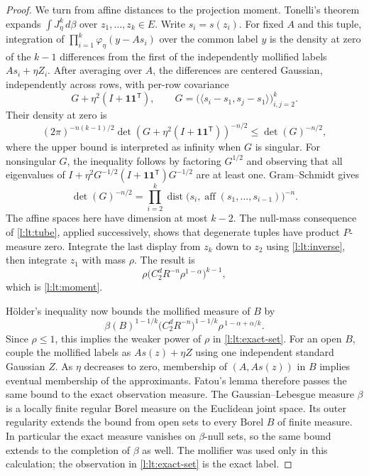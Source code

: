 \begin{proof}
We turn from affine distances to the projection moment.  Tonelli's
theorem expands $\int J_\eta^k\,d\beta$ over
$z_1,\ldots,z_k\in E$.  Write $s_i=s(z_i)$.  For fixed $A$ and this
tuple, integration of
$\prod_{i=1}^k\varphi_\eta(y-As_i)$ over the common label $y$ is the
density at zero of the $k-1$ differences from the first of the
independently mollified labels $As_i+\eta Z_i$.  After averaging over
$A$, the differences are centered Gaussian, independently across
rows, with per-row covariance
\begin{equation}\label{l:lt:covariance}
 G+\eta^2(I+\mathbf1\mathbf1^{\mathsf T}),\qquad
 G=\bigl(\langle s_i-s_1,s_j-s_1\rangle\bigr)_{i,j=2}^k.
\end{equation}
Their density at zero is
\[
 (2\pi)^{-n(k-1)/2}
 \det\!\left(G+\eta^2(I+\mathbf1\mathbf1^{\mathsf T})\right)^{-n/2}
 \le \det(G)^{-n/2},
\]
where the upper bound is interpreted as infinity when $G$ is
singular.  For nonsingular $G$, the inequality follows by factoring
$G^{1/2}$ and observing that all eigenvalues of
$I+\eta^2G^{-1/2}(I+\mathbf1\mathbf1^{\mathsf T})G^{-1/2}$
are at least one.  Gram--Schmidt gives
\[
 \det(G)^{-n/2}
 =\prod_{i=2}^k
   \operatorname{dist}\bigl(s_i,
      \operatorname{aff}(s_1,\ldots,s_{i-1})\bigr)^{-n}.
\]
The affine spaces here have dimension at most $k-2$.  The null-mass
consequence of \eqref{l:lt:tube}, applied successively, shows that
degenerate tuples have product $P$-measure zero.  Integrate the last
display from $z_k$ down to $z_2$ using \eqref{l:lt:inverse}, then
integrate $z_1$ with mass $\rho$.  The result is
\[
 \rho\bigl(C_2^dR^{-n}\rho^{1-\alpha}\bigr)^{k-1},
\]
which is \eqref{l:lt:moment}.

H\"older's inequality now bounds the mollified measure of $B$ by
\[
 \beta(B)^{1-1/k}
 \bigl(C_2^dR^{-n}\bigr)^{1-1/k}
 \rho^{\,1-\alpha+\alpha/k}.
\]
Since $\rho\le1$, this implies the weaker power of $\rho$ in
\eqref{l:lt:exact-set}.  For an open $B$, couple the mollified labels
as $As(z)+\eta Z$ using one independent standard Gaussian $Z$.
As $\eta$ decreases to zero, membership of $(A,As(z))$ in $B$
implies eventual membership of the approximants.  Fatou's lemma
therefore passes the same bound to the exact observation measure.
The Gaussian--Lebesgue measure $\beta$ is a locally finite regular
Borel measure on the Euclidean joint space.  Its outer regularity
extends the bound from open sets to every Borel $B$ of finite measure.
In particular the exact measure vanishes on $\beta$-null sets, so the
same bound extends to the completion of $\beta$ as well.  The mollifier
was used only in this calculation; the observation in
\eqref{l:lt:exact-set} is the exact label.
\end{proof}

